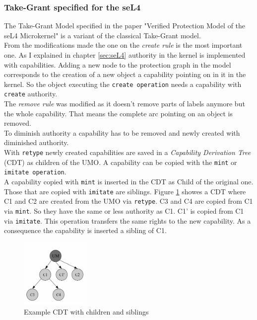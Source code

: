 \documentclass[11pt,a4paper,twoside]{article}
\begin{document}
	\subsubsection{Take-Grant specified for the seL4}\label{specT}
	The Take-Grant Model specified in the paper "Verified Protection Model of the seL4 Microkernel" \cite{TakeG} is a variant of the classical Take-Grant model. \\
	From the modifications made the one on the \textit{create rule} is the most important one. As I explained in chapter \ref{sec:seL4} authority in the kernel is implemented with capabilities. Adding a new node to the protection graph in the model corresponds to the creation of a new object a capability pointing on in it in the kernel. So the object executing the \texttt{create operation} needs a capability with \texttt{create} authority. \\
	The \textit{remove rule} was modified as it doesn't remove parts of labels anymore but the whole capability. That means the complete arc pointing on an object is removed. \\
	To diminish authority a capability has to be removed and newly created with diminished authority. \\
	With \texttt{retype} newly created capabilities are saved in a \textit{Capability Derivation Tree} (CDT) as children of the UMO. A capability can be copied with the \texttt{mint} or \texttt{imitate operation}. \\ 
	A capability  copied with \texttt{mint} is inserted in the CDT as Child of the original one. Those that are copied with \texttt{imitate} are siblings. Figure \ref{fig:cdt} showes a CDT where C1 and C2 are created from the UMO via \texttt{retype}. C3 and C4 are copied from C1 via \texttt{mint}. So they have the same or less authority as C1. C1' is copied from C1 via \texttt{imitate}. This operation transfers the same rights to the new capability. As a consequence the capability is inserted a sibling of C1. \\
	 \begin{figure}[H]
	\centering
		\includegraphics[width=0.3\textwidth]{./Pictures/CDT.jpg}
	\caption[CDT]{Example CDT with children and siblings \cite{PhDseL4}}
	\label{fig:cdt}
	\end{figure}
\end{document}
